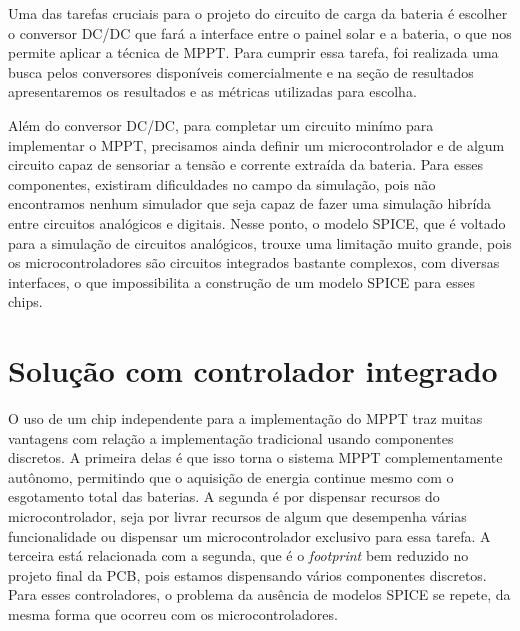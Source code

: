 Uma das tarefas cruciais para o projeto do circuito de carga da bateria é escolher o conversor DC/DC que fará a interface entre o painel solar e a bateria, o que nos permite aplicar a técnica de MPPT. Para cumprir essa tarefa, foi realizada uma busca pelos conversores disponíveis comercialmente e na seção de resultados apresentaremos os resultados e as métricas utilizadas para escolha. 

Além do conversor DC/DC, para completar um circuito minímo para implementar o MPPT, precisamos ainda definir um microcontrolador e de algum circuito capaz de sensoriar a tensão e corrente extraída da bateria. Para esses componentes, existiram dificuldades no campo da simulação, pois não encontramos nenhum simulador que seja capaz de fazer uma simulação hibrída entre circuitos analógicos e digitais. Nesse ponto, o modelo SPICE, que é voltado para a simulação de circuitos analógicos, trouxe uma limitação muito grande, pois os microcontroladores são circuitos integrados bastante complexos, com diversas interfaces, o que impossibilita a construção de um modelo SPICE para esses chips.


\section{Solução com controlador integrado}

O uso de um chip independente para a implementação do MPPT traz muitas vantagens com relação a implementação tradicional usando componentes discretos. A primeira delas é que isso torna o sistema MPPT complementamente autônomo, permitindo que o aquisição de energia continue mesmo com o esgotamento total das baterias. A segunda é por dispensar recursos do microcontrolador, seja por livrar recursos de algum que desempenha várias funcionalidade ou dispensar um microcontrolador exclusivo para essa tarefa. A terceira está relacionada com a segunda, que é o \textit{footprint} bem reduzido no projeto final da PCB, pois estamos dispensando vários componentes discretos. Para esses controladores, o problema da ausência de modelos SPICE se repete, da mesma forma que ocorreu com os microcontroladores.




